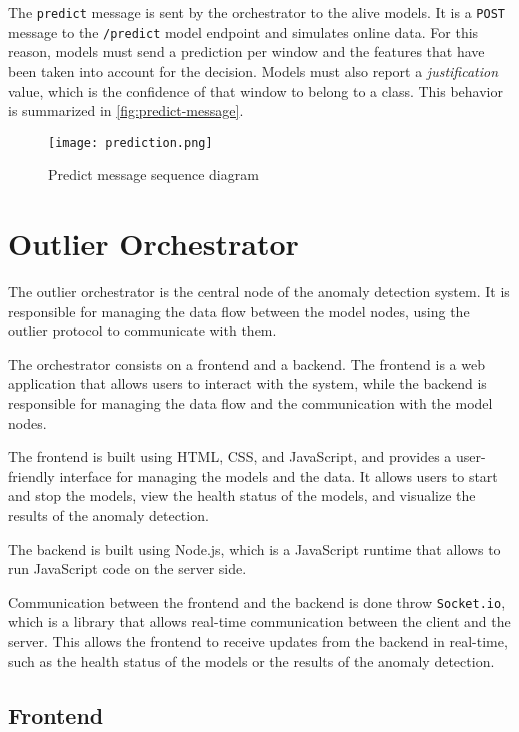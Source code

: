 The \texttt{predict} message is sent by the orchestrator to the alive models. It is a \texttt{POST} message to the \texttt{/predict} model endpoint and simulates online data. For this reason, models must send a prediction per window and the features that have been taken into account for the decision. Models must also report a \textit{justification} value, which is the confidence of that window to belong to a class. This behavior is summarized in \autoref{fig:predict-message}.

\begin{figure}[H]
    \centering
    \texttt{[image: prediction.png]}
    \caption{Predict message sequence diagram}
    \label{fig:predict-message}
\end{figure}

\section{Outlier Orchestrator}\label{sec:orchestrator}

The outlier orchestrator is the central node of the anomaly detection system. It is responsible for managing the data flow between the model nodes, using the outlier protocol to communicate with them.

The orchestrator consists on a frontend and a backend. The frontend is a web application that allows users to interact with the system, while the backend is responsible for managing the data flow and the communication with the model nodes.

The frontend is built using HTML, CSS, and JavaScript, and provides a user-friendly interface for managing the models and the data. It allows users to start and stop the models, view the health status of the models, and visualize the results of the anomaly detection.

The backend is built using Node.js, which is a JavaScript runtime that allows to run JavaScript code on the server side.

Communication between the frontend and the backend is done throw \texttt{Socket.io}, which is a library that allows real-time communication between the client and the server. This allows the frontend to receive updates from the backend in real-time, such as the health status of the models or the results of the anomaly detection.

\subsection{Frontend}

